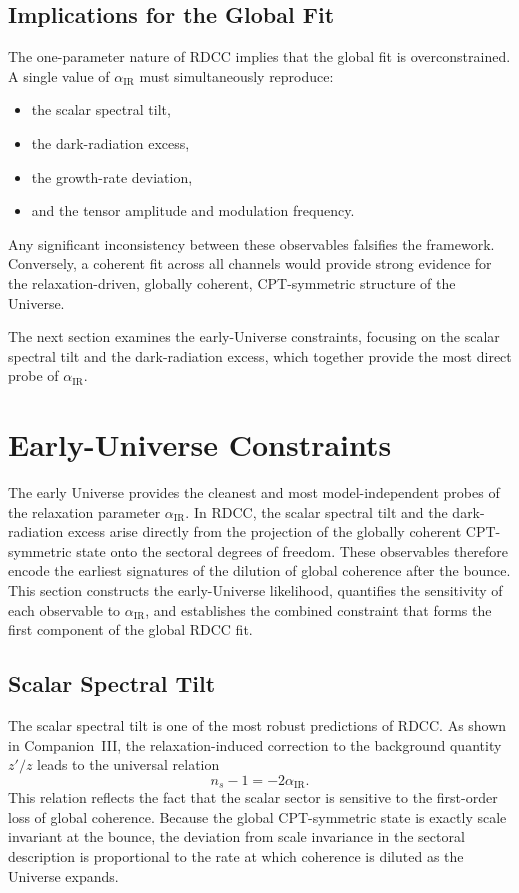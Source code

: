 \documentclass[11pt,a4paper]{article}
\begin{document}
\subsection{Implications for the Global Fit}

The one-parameter nature of RDCC implies that the global fit is overconstrained. A single value
of $\alpha_{\mathrm{IR}}$ must simultaneously reproduce:
\begin{itemize}
    \item the scalar spectral tilt,
    \item the dark-radiation excess,
    \item the growth-rate deviation,
    \item and the tensor amplitude and modulation frequency.
\end{itemize}
Any significant inconsistency between these observables falsifies the framework. Conversely, a
coherent fit across all channels would provide strong evidence for the relaxation-driven, globally
coherent, CPT-symmetric structure of the Universe.

The next section examines the early-Universe constraints, focusing on the scalar spectral tilt
and the dark-radiation excess, which together provide the most direct probe of
$\alpha_{\mathrm{IR}}$.

\section{Early-Universe Constraints}

The early Universe provides the cleanest and most model-independent probes of the relaxation
parameter $\alpha_{\mathrm{IR}}$. In RDCC, the scalar spectral tilt and the dark-radiation excess arise
directly from the projection of the globally coherent CPT-symmetric state onto the sectoral
degrees of freedom. These observables therefore encode the earliest signatures of the dilution of
global coherence after the bounce. This section constructs the early-Universe likelihood,
quantifies the sensitivity of each observable to $\alpha_{\mathrm{IR}}$, and establishes the combined
constraint that forms the first component of the global RDCC fit.

\subsection{Scalar Spectral Tilt}

The scalar spectral tilt is one of the most robust predictions of RDCC. As shown in
Companion~III, the relaxation-induced correction to the background quantity $z'/z$ leads to the
universal relation
\begin{equation}
    n_s - 1 = -2\alpha_{\mathrm{IR}}.
\end{equation}
This relation reflects the fact that the scalar sector is sensitive to the first-order loss of global
coherence. Because the global CPT-symmetric state is exactly scale invariant at the bounce,
the deviation from scale invariance in the sectoral description is proportional to the rate at which
coherence is diluted as the Universe expands.
\end{document}
